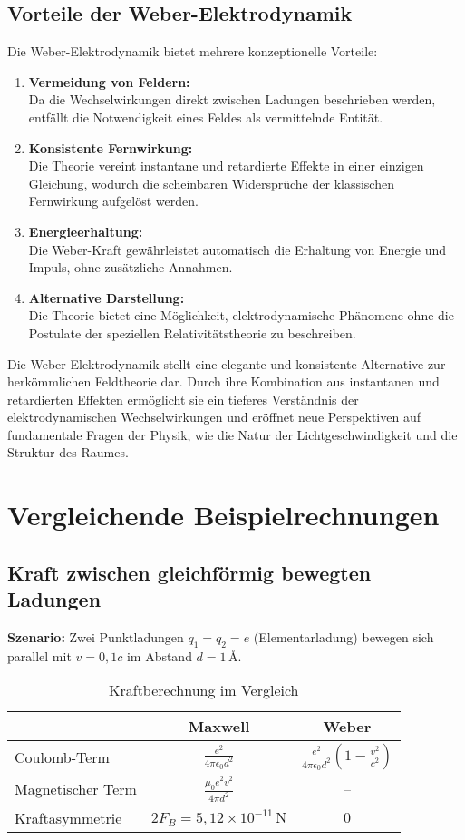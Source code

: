 \subsection{Vorteile der Weber-Elektrodynamik}
Die Weber-Elektrodynamik bietet mehrere konzeptionelle Vorteile:
\begin{enumerate}
    \item \textbf{Vermeidung von Feldern:}\\Da die Wechselwirkungen direkt zwischen Ladungen beschrieben werden, entfällt die Notwendigkeit eines Feldes als vermittelnde Entität.
    \item \textbf{Konsistente Fernwirkung:}\\Die Theorie vereint instantane und retardierte Effekte in einer einzigen Gleichung, wodurch die scheinbaren Widersprüche der klassischen Fernwirkung aufgelöst werden.
    \item \textbf{Energieerhaltung:}\\Die Weber-Kraft gewährleistet automatisch die Erhaltung von Energie und Impuls, ohne zusätzliche Annahmen.
    \item \textbf{Alternative Darstellung:}\\Die Theorie bietet eine Möglichkeit, elektrodynamische Phänomene ohne die Postulate der speziellen Relativitätstheorie zu beschreiben.
\end{enumerate}

Die Weber-Elektrodynamik stellt eine elegante und konsistente Alternative zur herkömmlichen Feldtheorie dar. Durch ihre Kombination aus instantanen und retardierten Effekten ermöglicht
sie ein tieferes Verständnis der elektrodynamischen Wechselwirkungen und eröffnet neue Perspektiven auf fundamentale Fragen der Physik, wie die Natur der Lichtgeschwindigkeit und die Struktur
des Raumes.

\section{Vergleichende Beispielrechnungen}
\subsection{Kraft zwischen gleichförmig bewegten Ladungen}

\textbf{Szenario:} Zwei Punktladungen $q_1 = q_2 = e$ (Elementarladung) bewegen sich parallel mit $v = 0,\!1c$ im Abstand $d = 1\,\text{\AA}$.

\begin{table}[ht]
\centering
\caption{Kraftberechnung im Vergleich}
\begin{tabular}{lcc}
\toprule
 & \textbf{Maxwell} & \textbf{Weber} \\
\midrule
Coulomb-Term & $\displaystyle\frac{e^2}{4\pi\epsilon_0 d^2}$ & $\displaystyle\frac{e^2}{4\pi\epsilon_0 d^2}\left(1-\frac{v^2}{c^2}\right)$ \\
Magnetischer Term & $\displaystyle\frac{\mu_0 e^2 v^2}{4\pi d^2}$ & -- \\
\hline
Kraftasymmetrie & $2F_B = 5,\!12\times10^{-11}\,\text{N}$ & $0$ \\
\bottomrule
\end{tabular}
\end{table}

